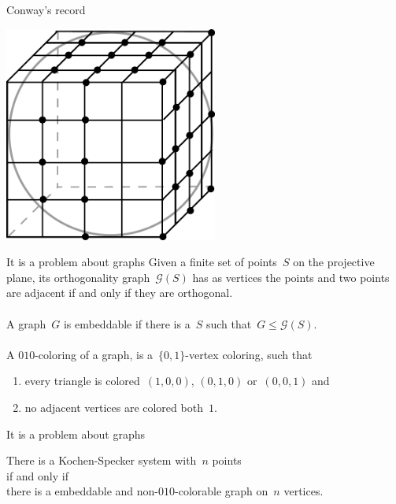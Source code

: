 \documentclass{beamer}
\begin{document}
\begin{frame}{Conway's record}
    \begin{center}
        \includegraphics[width=7cm]{../graphs/ks31.pdf}
    \end{center}
\end{frame}

\begin{frame}{It is a problem about graphs}
    Given a finite set of points~$S$ on the projective plane,
    its \alert{orthogonality graph}~$\mathcal{G}(S)$
    has as vertices the points
    and two points are adjacent if and only if they are orthogonal.
    \pause
    \\~\\
    A graph~$G$ is \alert{embeddable}
    if there is a~$S$
    such that~$G \leq \mathcal{G}(S)$.
    \pause
    \\~\\
    A \alert{$010$-coloring} of a graph, is a~$\{0,1\}$-vertex coloring,
    such that
    \begin{enumerate}
        \item every triangle is colored~$(1,0,0)$, $(0,1,0)$ or~$(0,0,1)$ and
        \item no adjacent vertices are colored both~$1$.
    \end{enumerate}
\end{frame}

\begin{frame}{It is a problem about graphs}
    \begin{center}
    There is a Kochen-Specker system with~$n$ points \\
    if and only if \\
    there is a \alert{embeddable} and \alert{non-$010$-colorable}
            graph on~$n$ vertices.
    \end{center}
\end{frame}
\end{document}
